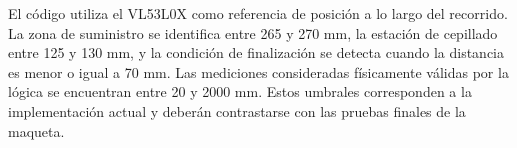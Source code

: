 El código utiliza el VL53L0X como referencia de posición a lo largo del recorrido. La zona de suministro se identifica entre 265 y 270 mm, la estación de cepillado entre 125 y 130 mm, y la condición de finalización se detecta cuando la distancia es menor o igual a 70 mm. Las mediciones consideradas físicamente válidas por la lógica se encuentran entre 20 y 2000 mm. Estos umbrales corresponden a la implementación actual y deberán contrastarse con las pruebas finales de la maqueta.
